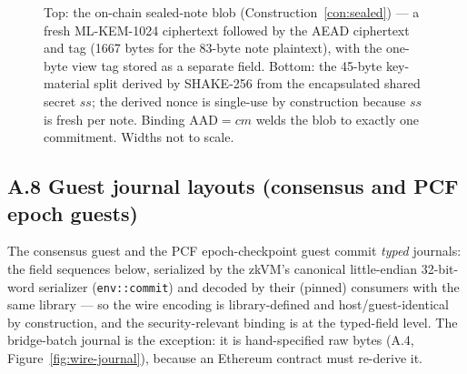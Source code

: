 \documentclass[11pt]{article}
\newcommand{\code}[1]{\texttt{#1}}
\newcommand{\mlkem}{ML\mbox{-}KEM\mbox{-}1024}
\newcommand{\shake}{SHAKE\mbox{-}256}
\theoremstyle{plain}
\theoremstyle{definition}
\theoremstyle{remark}
\begin{document}
\begin{figure}[ht]
{}%
\caption{Top: the on-chain sealed-note blob (Construction~\ref{con:sealed})
--- a fresh \mlkem{} ciphertext followed by the AEAD ciphertext and tag
(1667 bytes for the 83-byte note plaintext), with the one-byte view tag
stored as a separate field. Bottom: the 45-byte key-material split derived
by \shake{} from the encapsulated shared secret $\mathit{ss}$; the derived
nonce is single-use by construction because $\mathit{ss}$ is fresh per
note. Binding $\mathrm{AAD} = \mathit{cm}$ welds the blob to exactly one
commitment. Widths not to scale.}
\label{fig:wire-sealed}
\end{figure}

\subsection*{A.8 \quad Guest journal layouts (consensus and PCF epoch guests)}
The consensus guest and the PCF epoch-checkpoint guest commit \emph{typed}
journals: the field sequences below, serialized by the zkVM's canonical
little-endian 32-bit-word serializer (\code{env::commit}) and decoded by
their (pinned) consumers with the same library --- so the wire encoding is
library-defined and host/guest-identical by construction, and the
security-relevant binding is at the typed-field level. The bridge-batch
journal is the exception: it is hand-specified raw bytes (A.4,
Figure~\ref{fig:wire-journal}), because an Ethereum contract must re-derive
it.
\end{document}
